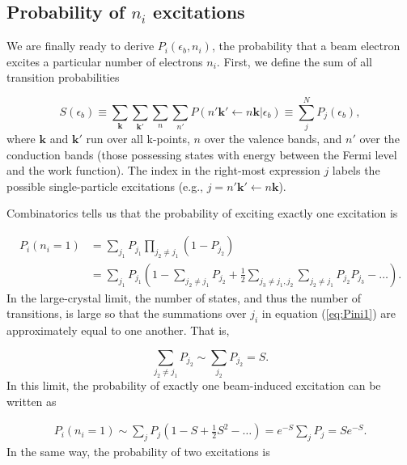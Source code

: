 \documentclass{article}
\begin{document}
\subsection{Probability of $n_i$ excitations}
\label{sec:Pi}

We are finally ready to derive $P_i(\epsilon_b, n_i)$, the probability that a
beam electron excites a particular number of electrons $n_i$.  First, we define
the sum of all transition probabilities

\begin{equation}
  S(\epsilon_b)
  \equiv
  \sum_\mathbf{k} \sum_\mathbf{k'} \sum_n \sum_{n'}
  P(n'\mathbf{k}'\leftarrow n\mathbf{k}|\epsilon_b)
  \equiv
  \sum_j^N P_j(\epsilon_b),
  \label{eq:S}
\end{equation}
%
where $\mathbf{k}$ and $\mathbf{k'}$ run over all k-points, $n$ over
the valence bands, and $n'$ over the conduction bands (those possessing states
with energy between the Fermi level and the work function).
The index in the right-most expression $j$ labels the possible single-particle
excitations (e.g., $j=n'\mathbf{k'}\leftarrow n\mathbf{k}$).

Combinatorics tells us that the probability of exciting exactly one excitation
is

\begin{equation}
  \begin{aligned}
    P_i(n_i=1)
    &=
    \sum_{j_1} P_{j_1}
    \prod_{j_2\neq j_1} (1 - P_{j_2})
    \\&=
    \sum_{j_1} P_{j_1}
    \left(
      1 - \sum_{j_2\neq j_1} P_{j_2}
      + \frac{1}{2} \sum_{j_3\neq j_1,j_2} \sum_{j_2\neq j_1} P_{j_2} P_{j_3}
      - \dots
    \right).
  \label{eq:Pini1}
  \end{aligned}
\end{equation}
%
In the large-crystal limit, the number of states, and thus the number of
transitions, is large so that the summations over $j_i$ in equation
(\ref{eq:Pini1}) are approximately equal to one another.
That is,

\begin{equation}
  \sum_{j_2\neq j_1}P_{j_2}
  \sim
  \sum_{j_2}P_{j_2}
  =
  S.
\end{equation}
%
In this limit, the probability of exactly one beam-induced excitation can be
written as

\begin{equation}
  \begin{aligned}
  P_i(n_i=1)
  \sim
  \sum_j P_j
  \left( 1 - S + \frac{1}{2}S^2 - \dots \right)
  =
  e^{-S}\sum_j P_j
  =
  Se^{-S}.
\end{aligned}
\label{eq:Pi(1)}
\end{equation}
%
In the same way, the probability of two excitations is
\end{document}
